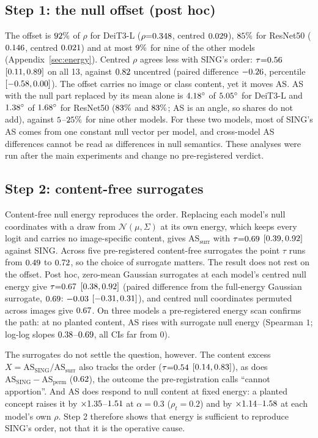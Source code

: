 \documentclass[10pt]{article}
\newcommand{\ASS}{\mathrm{AS}_{\mathrm{SING}}}
\newcommand{\ASsurr}{\mathrm{AS}_{\mathrm{surr}}}
\begin{document}
\subsection{Step 1: the null offset (post hoc)}
\label{sec:offset}
The offset is $92\%$ of $\rho$ for DeiT3-L ($\rho{=}0.348$, centred $0.029$), $85\%$ for ResNet50 ($0.146$, centred $0.021$) and at most $9\%$ for nine of the other models (Appendix~\ref{sec:energy}).
Centred $\rho$ agrees less with SING's order: $\tau{=}0.56$ $[0.11,0.89]$ on all 13, against $0.82$ uncentred (paired difference ${-}0.26$, percentile $[{-}0.58,0.00]$).
The offset carries no image or class content, yet it moves AS. AS with the null part replaced by its mean alone is $4.18^\circ$ of $5.05^\circ$ for DeiT3-L and $1.38^\circ$ of $1.68^\circ$ for ResNet50 ($83\%$ and $83\%$; AS is an angle, so shares do not add), against $5$--$25\%$ for nine other models.
For these two models, most of SING's AS comes from one constant null vector per model, and cross-model AS differences cannot be read as differences in null semantics.
These analyses were run after the main experiments and change no pre-registered verdict.

\subsection{Step 2: content-free surrogates}
\label{sec:surr}
Content-free null energy reproduces the order. Replacing each model's null coordinates with a draw from $\mathcal{N}(\mu,\Sigma)$ at its own energy, which keeps every logit and carries no image-specific content, gives $\ASsurr$ with $\tau{=}0.69$ $[0.39,0.92]$ against SING. Across five pre-registered content-free surrogates the point $\tau$ runs from $0.49$ to $0.72$, so the choice of surrogate matters.
The result does not rest on the offset. Post hoc, zero-mean Gaussian surrogates at each model's centred null energy give $\tau{=}0.67$ $[0.38,0.92]$ (paired difference from the full-energy Gaussian surrogate, $0.69$: ${-}0.03$ $[{-}0.31,0.31]$), and centred null coordinates permuted across images give $0.67$.
On three models a pre-registered energy scan confirms the path: at no planted content, AS rises with surrogate null energy (Spearman $1$; log-log slopes $0.38$--$0.69$, all CIs far from 0).

The surrogates do not settle the question, however. The content excess $X=\ASS/\ASsurr$ also tracks the order ($\tau{=}0.54$ $[0.14,0.83]$), as does $\ASS-\mathrm{AS}_{\mathrm{perm}}$ ($0.62$), the outcome the pre-registration calls ``cannot apportion''.
And AS does respond to null content at fixed energy: a planted concept raises it by $\times1.35$--$1.51$ at $\alpha{=}0.3$ ($\rho_t{=}0.2$) and by $\times1.14$--$1.58$ at each model's own $\rho$.
Step 2 therefore shows that energy is sufficient to reproduce SING's order, not that it is the operative cause.
\end{document}
